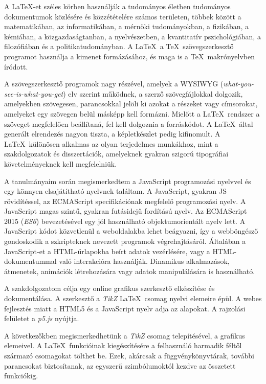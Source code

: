 
A \LaTeX -et \cite{latex}\cite{latexlamport} széles körben használják a tudományos életben tudományos dokumentumok közlésére és közzétételére számos területen, többek között a matematikában, az informatikában, a mérnöki tudományokban, a fizikában, a kémiában, a közgazdaságtanban, a nyelvészetben, a kvantitatív pszichológiában, a filozófiában és a politikatudományban. A \LaTeX\ a \TeX\ szövegszerkesztő programot használja a kimenet formázásához, és maga is a \TeX\ makrónyelvben íródott.

A szövegszerkesztő programok nagy részével, amelyek a WYSIWYG (\textit{what-you-see-is-what-you-get}) elv szerint működnek, a szerző szövegfájlokkal dolgozik, amelyekben szövegesen, parancsokkal jelöli ki azokat a részeket vagy címsorokat, amelyeket egy szövegen belül másképp kell formázni. Mielőtt a \LaTeX\ rendszer a szöveget megfelelően beállítaná, fel kell dolgoznia a forráskódot. A \LaTeX\ által generált elrendezés nagyon tiszta, a képletkészlet pedig kifinomult. A \LaTeX\ különösen alkalmas az olyan terjedelmes munkákhoz, mint a szakdolgozatok és disszertációk, amelyeknek gyakran szigorú tipográfiai követelményeknek kell megfelelniük.

A tanulmányaim során megismerkedtem a JavaScript \cite{js} programozási nyelvvel és egy könnyen elsajátítható nyelvnek találtam. A JavaScript, gyakran JS rövidítéssel, az ECMAScript \cite{ecmascript} specifikációnak megfelelő programozási nyelv. A JavaScript magas szintű, gyakran futásidejű fordítású nyelv. Az ECMAScript 2015 \cite{ecmascript6} (\textit{ES6}) bevezetésével egy jól használható  objektumorientált nyelv lett. A JavaScript kódot közvetlenül a weboldalakba lehet beágyazni, így a webböngésző gondoskodik a szkripteknek nevezett programok végrehajtásáról. Általában a JavaScript-et a HTML-űrlapokba beírt adatok vezérlésére, vagy a HTML-dokumentummal való interakcióra használják. Dinamikus alkalmazások, átmenetek, animációk létrehozására vagy adatok manipulálására is használható.

A szakdolgozatom célja egy online grafikus szerkesztő elkészítése és dokumentálása. A szerkesztő a \textit{TikZ} \LaTeX\ csomag nyelvi elemeire épül. A webes fejlesztés miatt a HTML5 \cite{html5} és a JavaScript nyelv adja az alapokat. A rajzolási felületet a \textit{p5.js} \cite{p5js} nyújtja.

A következőkben megismerkedhetünk a \textit{TikZ} \cite{tikzmanual2} csomag telepítésével, a grafikus elemeivel. A \LaTeX\ funkcióinak kiegészítésére a felhasználó harmadik féltől származó csomagokat tölthet be. Ezek, akárcsak a függvénykönyvtárak, további parancsokat biztosítanak, az egyszerű szimbólumoktól kezdve az összetett funkciókig. 

